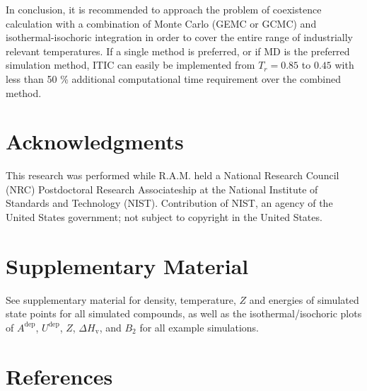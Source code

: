 \documentclass[%
 aip,
 jcp,
 sd,%
 amsmath,amssymb,
 reprint,%
]{revtex4-1}
\begin{document}
In conclusion, it is recommended to approach the problem of coexistence calculation with a combination of Monte Carlo (GEMC or GCMC) and isothermal-isochoric  integration in order to cover the entire range of industrially relevant temperatures. If a single method is preferred, or if MD is the preferred simulation method, ITIC can easily be implemented from $T_r = 0.85$ to $0.45$ with less than 50 \% additional computational time requirement over the combined method.

\section{Acknowledgments}

This research was performed while R.A.M. held a National Research Council (NRC) Postdoctoral Research Associateship at the National Institute of Standards and Technology (NIST). Contribution of NIST, an agency of the United States government; not subject to copyright in the United States.

\section{Supplementary Material} \label{sec:SupMat} 
See supplementary material for density, temperature, $Z$ and energies of simulated state points for all simulated compounds, as well as the isothermal/isochoric plots of $A^{\mathrm{dep}}$, $U^{\mathrm{dep}}$, $Z$, $\Delta H_{\mathrm{v}}$, and $B_2$ for all example simulations. 

\section{References} \label{sec:ref} 

\end{document}
